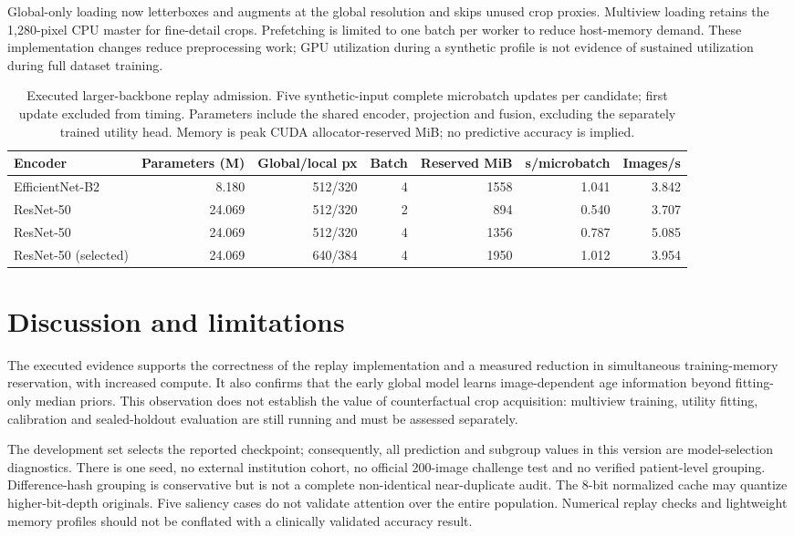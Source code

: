 \documentclass[nolineno]{ieeeaccess}
\begin{document}
Global-only loading now letterboxes and augments at the global resolution and skips unused crop proxies. Multiview loading retains the 1,280-pixel CPU master for fine-detail crops. Prefetching is limited to one batch per worker to reduce host-memory demand. These implementation changes reduce preprocessing work; GPU utilization during a synthetic profile is not evidence of sustained utilization during full dataset training.

\begin{table}[!t]
\centering\footnotesize
\caption{Executed larger-backbone replay admission. Five synthetic-input complete microbatch updates per candidate; first update excluded from timing. Parameters include the shared encoder, projection and fusion, excluding the separately trained utility head. Memory is peak CUDA allocator-reserved MiB; no predictive accuracy is implied.}
\label{tab:upgrade_admission}
\begin{tabular}{lrrrrrr}
\toprule
Encoder & Parameters (M) & Global/local px & Batch & Reserved MiB & s/microbatch & Images/s\\
\midrule
EfficientNet-B2 & 8.180 & 512/320 & 4 & 1558 & 1.041 & 3.842\\
ResNet-50 & 24.069 & 512/320 & 2 & 894 & 0.540 & 3.707\\
ResNet-50 & 24.069 & 512/320 & 4 & 1356 & 0.787 & 5.085\\
ResNet-50 (selected) & 24.069 & 640/384 & 4 & 1950 & 1.012 & 3.954\\
\bottomrule
\end{tabular}
\end{table}

\section{Discussion and limitations}
The executed evidence supports the correctness of the replay implementation and a measured reduction in simultaneous training-memory reservation, with increased compute. It also confirms that the early global model learns image-dependent age information beyond fitting-only median priors. This observation does not establish the value of counterfactual crop acquisition: multiview training, utility fitting, calibration and sealed-holdout evaluation are still running and must be assessed separately.

The development set selects the reported checkpoint; consequently, all prediction and subgroup values in this version are model-selection diagnostics. There is one seed, no external institution cohort, no official 200-image challenge test and no verified patient-level grouping. Difference-hash grouping is conservative but is not a complete non-identical near-duplicate audit. The 8-bit normalized cache may quantize higher-bit-depth originals. Five saliency cases do not validate attention over the entire population. Numerical replay checks and lightweight memory profiles should not be conflated with a clinically validated accuracy result.
\end{document}
